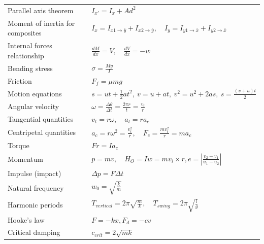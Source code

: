 \documentclass{article}
\begin{document}
\begin{tabular}{|l|l|}
    Parallel axis theorem             & $I_{x'}=I_{x}+Ad^2$                                                                     \\
    Moment of inertia for composites  & $I_x=I_{x1\to\bar{y}} + I_{x2\to\bar{y}},\quad I_y=I_{y1\to\bar{x}} + I_{y2\to\bar{x}}$ \\
    Internal forces relationship      & $\frac{dM}{dx}=V,\quad \frac{dV}{dx}=-w$                                                \\
    Bending stress                    & $\sigma=\frac{My}{I}$                                                                   \\
    Friction                          & $F_f=\mu mg$                                                                            \\
    Motion equations                  & $s=ut+\frac{1}{2}at^2,\ v=u+at,\ v^2=u^2+2as,\ s=\frac{(v+u)t}{2}$                      \\
    Angular velocity                  & $\omega = \frac{\Delta\theta}{\Delta t}=\frac{2\pi r}{t} = \frac{v_t}{r}$               \\
    Tangential quantities             & $v_t = r\omega,\quad a_t = r a_c$                                                       \\
    Centripetal quantities            & $a_c = r\omega^2 = \frac{v_t^2}{r},\quad F_c = \frac{mv_t^2}{r} = ma_c$                 \\
    Torque                            & $Fr = Ia_c$                                                                             \\
    Momentum                          & $p=mv, \quad H_O=Iw=mv_i\times r,e=|\frac{v_{2}-v_{1}}{u_{1}-u_{2}}|$                   \\
    Impulse (impact)                  & $\Delta p=F\Delta t$                                                                    \\
    Natural frequency                 & $w_0=\sqrt{\frac{k}{m}}$                                                                \\
    Harmonic periods                  & $T_{vertical} = 2\pi\sqrt{\frac{m}{k}},\quad T_{swing} = 2\pi\sqrt{\frac{l}{g}}$        \\
    Hooke's law                       & $F=-kx,F_d=-cv$                                                                         \\
    Critical damping                  & $c_{crit}=2\sqrt{mk}$                                                                   \\

\end{tabular}
\end{document}
